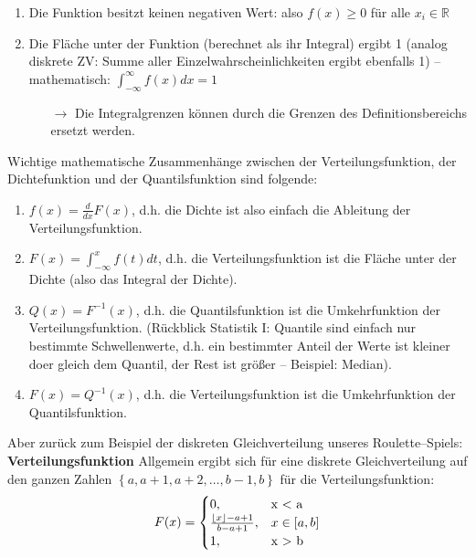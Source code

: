 \documentclass[a4paper]{article}
\DeclarePairedDelimiter\floor{\lfloor}{\rfloor}
\begin{document}

\begin{enumerate}
    \item Die Funktion besitzt keinen negativen Wert: also $f(x)\geq 0$ für alle $x_i \in \mathbb{R}$
    \item Die Fläche unter der Funktion (berechnet als ihr Integral) ergibt 1 (analog diskrete ZV: Summe aller Einzelwahrscheinlichkeiten ergibt ebenfalls 1) -- mathematisch: $\int_{-\infty}^{\infty} f(x) dx = 1$
    \begin{itemize}
	\item[$\rightarrow$] Die Integralgrenzen können durch die Grenzen des Definitionsbereichs ersetzt werden.
	\end{itemize}
\end{enumerate}

\noindent Wichtige mathematische Zusammenhänge zwischen der Verteilungsfunktion, der Dichtefunktion und der Quantilsfunktion sind folgende:

\begin{enumerate}
    \item $f(x)= \frac{d}{dx} F(x)$, d.h. die Dichte ist also einfach die Ableitung der Verteilungsfunktion.
    \item $F(x)= \int_{-\infty}^{x} f(t)dt$, d.h. die Verteilungsfunktion ist die Fläche unter der Dichte (also das Integral der Dichte).
    \item $Q(x)= F^{-1}(x)$, d.h. die Quantilsfunktion ist die Umkehrfunktion der Verteilungsfunktion. (Rückblick Statistik I: Quantile sind einfach nur bestimmte Schwellenwerte, d.h. ein bestimmter Anteil der Werte ist kleiner doer gleich dem Quantil, der Rest ist größer -- Beispiel: Median).
    \item $F(x) = Q^{-1}(x)$, d.h. die Verteilungsfunktion ist die Umkehrfunktion der Quantilsfunktion.
\end{enumerate}

\noindent Aber zurück zum Beispiel der diskreten Gleichverteilung unseres Roulette--Spiels:\\

\noindent \textbf{Verteilungsfunktion}
Allgemein ergibt sich für eine diskrete Gleichverteilung auf den ganzen Zahlen 
$\left\{a,a+1,a+2,\ldots, b-1, b\right\}$ für die Verteilungsfunktion:
\begin{equation*}
    F(x)=\begin{cases}
			0, & \text{x < a}\\
            \frac{\floor*{x}-a+1}{b-a+1}, & \text{$x \in [a,b]$}\\
            1, & \text{x > b}
		 \end{cases}
\end{equation*}
\end{document}
